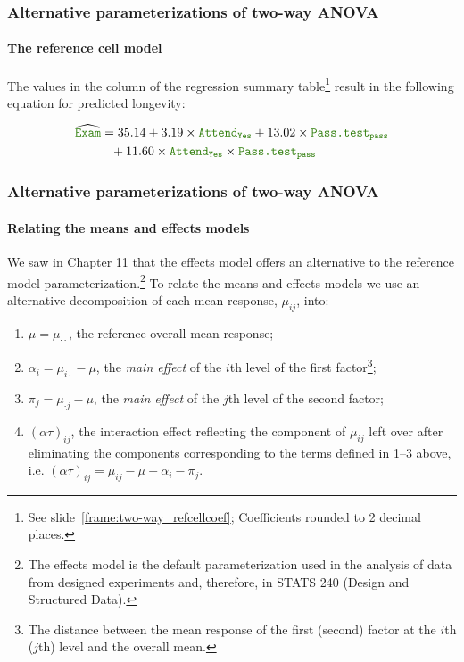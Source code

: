 \documentclass{beamer}\usepackage[]{graphicx}\usepackage[]{xcolor}
\begin{document}
\begin{frame}[fragile]
\frametitle{Alternative parameterizations of two-way ANOVA}
\framesubtitle{The reference cell model}

The values in the  column of the regression summary table\footnote{See slide~\ref{frame:two-way_refcellcoef}; Coefficients rounded to 2 decimal places.} result in the following equation for predicted longevity:
    

    
\medskip
  
\begin{align*}
  \widehat{\rcode{Exam}} &=35.14+3.19\times \rcode{Attend}_{\rcode{Yes}} + 13.02\times \rcode{Pass.test}_{\rcode{pass}} \\
  &\phantom{=}+ 11.60\times \rcode{Attend}_{\rcode{Yes}} \times \rcode{Pass.test}_{\rcode{pass}}
\end{align*}
  
\end{frame}
  


\begin{frame}[fragile]
\frametitle{Alternative parameterizations of two-way ANOVA}
\framesubtitle{Relating the means and effects models}

\medskip

We saw in Chapter 11 that the effects model offers an alternative to the reference model parameterization.\footnote{\scriptsize The effects model is the default parameterization used in the analysis of data from designed experiments and, therefore, in STATS 240 (Design and Structured Data).} To relate the means and effects models we use an alternative decomposition of each mean response, $\mu_{ij}$, into:

\medskip

\begin{enumerate}
\setlength\itemsep{0.55em}
  \item $\mu=\mu_{\cdot\cdot}$, the reference overall mean response;
  \item $\alpha_i = \mu_{i\cdot}-\mu$, the {\em main effect} of the $i$th level of the first factor\footnote{\scriptsize The distance between the mean response of the first (second) factor at the $i$th ($j$th) level and the overall mean.\label{fn:maineffect}};
  \item $\pi_j = \mu_{\cdot j}-\mu$, the {\em main effect} of the $j$th level of the second factor;
  \item $(\alpha\tau)_{ij}$, the interaction effect reflecting the component of $\mu_{ij}$ left over after eliminating the components corresponding to the terms defined in 1--3 above, i.e. $(\alpha\tau)_{ij} = \mu_{ij} - \mu - \alpha_i - \pi_j$.
  
\end{enumerate}

\end{frame}
\end{document}
